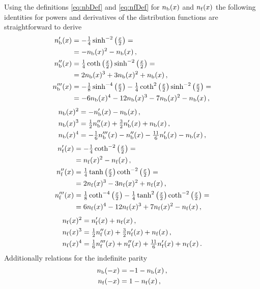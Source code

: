 Using the definitions \eqref{eq:nbDef} and \eqref{eq:nfDef} for $n_\mathrm{b}(x)$ and $n_\mathrm{f}(x)$ the following identities for powers and derivatives of the distribution functions are straightforward to derive
\begin{align}
	n_\mathrm{b}'(x) &= -\tfrac{1}{4} \sinh^{-2}\left(\tfrac{x}{2}\right)=\\
		&= -n_\mathrm{b}(x)^2-n_\mathrm{b}(x) \, ,\notag\\
	n_\mathrm{b}''(x) &= \tfrac{1}{4} \coth \left(\tfrac{x}{2}\right) \sinh^{-2}\left(\tfrac{x}{2}\right)=\\
		&= 2 n_\mathrm{b}(x)^3+3 n_\mathrm{b}(x)^2+n_\mathrm{b}(x) \, ,\notag\\
	n_\mathrm{b}'''(x) &= -\tfrac{1}{8} \sinh^{-4}\left(\tfrac{x}{2}\right)-\tfrac{1}{4} \coth ^2\left(\tfrac{x}{2}\right) \sinh^{-2}\left(\tfrac{x}{2}\right)=\\
		&= -6 n_\mathrm{b}(x)^4-12 n_\mathrm{b}(x)^3-7 n_\mathrm{b}(x)^2-n_\mathrm{b}(x) \, ,\notag
\end{align}
\begin{align}
	n_\mathrm{b}(x)^2 &= -n_\mathrm{b}'(x)-n_\mathrm{b}(x) \, ,\\
	n_\mathrm{b}(x)^3 &= \tfrac{1}{2}n_\mathrm{b}''(x) + \tfrac{3}{2}n_\mathrm{b}'(x)+n_\mathrm{b}(x) \, ,\\
	n_\mathrm{b}(x)^4 &= -\tfrac{1}{6} n_\mathrm{b}'''(x)-n_\mathrm{b}''(x)-\tfrac{11}{6}n_\mathrm{b}'(x)-n_\mathrm{b}(x) \, ,
\end{align}
\begin{align}
	n_\mathrm{f}'(x) &= -\tfrac{1}{4} \coth^{-2}\left(\tfrac{x}{2}\right)=\\
		&= n_\mathrm{f}(x)^2-n_\mathrm{f}(x) \, ,\notag\\
	n_\mathrm{f}''(x) &= \tfrac{1}{4} \tanh \left(\tfrac{x}{2}\right) \coth^{-2}\left(\tfrac{x}{2}\right)=\\
		&= 2 n_\mathrm{f}(x)^3-3 n_\mathrm{f}(x)^2+n_\mathrm{f}(x) \, ,\notag\\
	n_\mathrm{f}'''(x) &= \tfrac{1}{8} \coth^{-4}\left(\tfrac{x}{2}\right)-\tfrac{1}{4} \tanh ^2\left(\tfrac{x}{2}\right) \coth^{-2}\left(\tfrac{x}{2}\right)=\\
		&= 6 n_\mathrm{f}(x)^4-12 n_\mathrm{f}(x)^3+7 n_\mathrm{f}(x)^2-n_\mathrm{f}(x) \, ,\notag
\end{align}
\begin{align}
	n_\mathrm{f}(x)^2 &= n_\mathrm{f}'(x)+n_\mathrm{f}(x) \, ,\\
	n_\mathrm{f}(x)^3 &= \tfrac{1}{2}n_\mathrm{f}''(x) + \tfrac{3}{2}n_\mathrm{f}'(x)+n_\mathrm{f}(x) \, ,\\
	n_\mathrm{f}(x)^4 &= \tfrac{1}{6} n_\mathrm{f}'''(x) + n_\mathrm{f}''(x) +\tfrac{11}{6}n_\mathrm{f}'(x)+n_\mathrm{f}(x)\, .
\end{align}
Additionally relations for the indefinite parity 
\begin{align}
	n_\mathrm{b}(-x)&=-1-n_\mathrm{b}(x) \, ,\\
	n_\mathrm{f}(-x)&= 1-n_\mathrm{f}(x) \, ,
\end{align}
